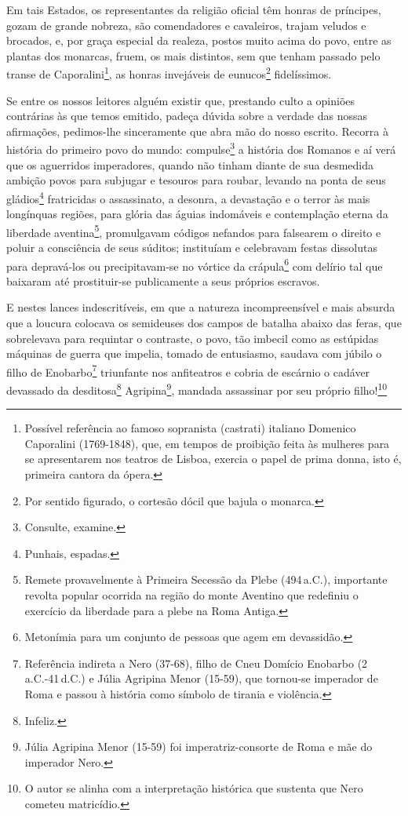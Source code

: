 Em tais Estados, os representantes da religião oficial têm honras de
príncipes, gozam de grande nobreza, são comendadores e cavaleiros,
trajam veludos e brocados, e, por graça especial da realeza, postos
muito acima do povo, entre as plantas dos monarcas, fruem, os mais
distintos, sem que tenham passado pelo transe de Caporalini\footnote{
  Possível referência ao famoso sopranista (castrati) italiano Domenico
  Caporalini (1769-1848), que, em tempos de proibição feita às mulheres
  para se apresentarem nos teatros de Lisboa, exercia o papel de prima
  donna, isto é, primeira cantora da ópera.}, as honras invejáveis de
eunucos\footnote{Por sentido figurado, o cortesão dócil que bajula o
  monarca.} fidelíssimos.

Se entre os nossos leitores alguém existir que, prestando culto a
opiniões contrárias às que temos emitido, padeça dúvida sobre a verdade
das nossas afirmações, pedimos-lhe sinceramente que abra mão do nosso
escrito. Recorra à história do primeiro povo do mundo:
compulse\footnote{Consulte, examine.} a história dos Romanos e aí verá
que os aguerridos imperadores, quando não tinham diante de sua desmedida
ambição povos para subjugar e tesouros para roubar, levando na ponta de
seus gládios\footnote{Punhais, espadas.} fratricidas o assassinato, a
desonra, a devastação e o terror às mais longínquas regiões, para glória
das águias indomáveis e contemplação eterna da liberdade
aventina\footnote{Remete provavelmente à Primeira Secessão da Plebe
  (494\,a.C.), importante revolta popular ocorrida na região do monte
  Aventino que redefiniu o exercício da liberdade para a plebe na Roma
  Antiga.}, promulgavam códigos nefandos para falsearem o direito e
poluir a consciência de seus súditos; instituíam e celebravam festas
dissolutas para depravá-los ou precipitavam-se no vórtice da
crápula\footnote{Metonímia para um conjunto de pessoas que agem em
  devassidão.} com delírio tal que baixaram até prostituir-se
publicamente a seus próprios escravos.

E nestes lances indescritíveis, em que a natureza incompreensível e mais
absurda que a loucura colocava os semideuses dos campos de batalha
abaixo das feras, que sobrelevava para requintar o contraste, o povo,
tão imbecil como as estúpidas máquinas de guerra que impelia, tomado de
entusiasmo, saudava com júbilo o filho de Enobarbo\footnote{Referência
  indireta a Nero (37-68), filho de Cneu Domício Enobarbo (2\,a.C.-41\,d.C.) e
  Júlia Agripina Menor (15-59), que tornou-se imperador de Roma e passou
  à história como símbolo de tirania e violência.} triunfante nos
anfiteatros e cobria de escárnio o cadáver devassado da
desditosa\footnote{Infeliz.} Agripina\footnote{Júlia Agripina Menor
  (15-59) foi imperatriz-consorte de Roma e mãe do imperador Nero.},
mandada assassinar por seu próprio filho!\footnote{O autor se alinha
  com a interpretação histórica que sustenta que Nero cometeu
  matricídio.}

